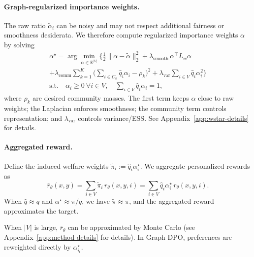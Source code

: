 \documentclass{article}
\theoremstyle{plain}
\theoremstyle{definition}
\theoremstyle{remark}
\begin{document}
\paragraph{Graph-regularized importance weights.}

The raw ratio $\tilde\alpha_i$ can be noisy and may not respect additional
fairness or smoothness desiderata. We therefore compute regularized
importance weights $\alpha$ by solving
\begin{equation}
\begin{aligned}
    \alpha^\star
    = \arg\min_{\alpha \in \mathbb{R}^{|V|}}
    \Bigg\{
        \frac{1}{2} \|\alpha - \tilde\alpha\|_2^2
        + \lambda_{\text{smooth}} \, \alpha^\top L_w \alpha \\
        + \lambda_{\text{comm}} \sum_{k=1}^{K}
          \Big( \sum_{i \in C_k} \hat q_i \alpha_i - \rho_k \Big)^2
        + \lambda_{\text{var}} \sum_{i \in V} \hat q_i \alpha_i^2
    \Bigg\}
    \\
    \text{s.t.}\quad
    \alpha_i \ge 0 \ \forall i \in V,
    \quad
    \sum_{i \in V} \hat q_i \alpha_i = 1,
\end{aligned}
\label{eq:alpha-star}
\end{equation}
where $\rho_k$ are desired community masses. The first term keeps $\alpha$ close to raw weights; the Laplacian enforces smoothness; the community term controls representation; and $\lambda_{\text{var}}$ controls variance/ESS. See Appendix~\ref{app:wstar-details} for details.

\paragraph{Aggregated reward.}

Define the induced welfare weights $\tilde\pi_i := \hat q_i \alpha_i^\star$.
We aggregate personalized rewards as
\begin{equation}
    \bar r_\theta(x,y)
    =
    \sum_{i \in V} \tilde\pi_i \, r_\theta(x,y,i)
    =
    \sum_{i \in V} \hat q_i \alpha_i^\star \, r_\theta(x,y,i).
    \label{eq:aggregated-reward}
\end{equation}
When $\hat q \approx q$ and $\alpha^\star \approx \pi / q$, we have
$\tilde\pi \approx \pi$, and the aggregated reward approximates the target.

When $|V|$ is large, $\bar r_\theta$ can be approximated by Monte Carlo (see Appendix~\ref{app:method-details} for details). In Graph-DPO, preferences are reweighted directly by $\alpha_{i_t}^\star$.
\end{document}
